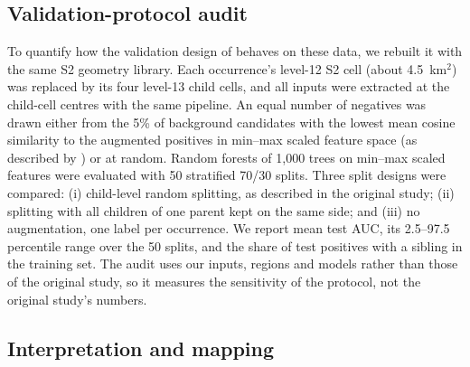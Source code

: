 \documentclass[pdflatex,sn-apa]{sn-jnl}
\begin{document}
\subsection{Validation-protocol audit}\label{sec:audit-methods}

To quantify how the validation design of \citet{Parsa2024} behaves on these data, we rebuilt it with the same S2 geometry library. Each occurrence's level-12 S2 cell (about 4.5~km$^2$) was replaced by its four level-13 child cells, and all inputs were extracted at the child-cell centres with the same pipeline. An equal number of negatives was drawn either from the 5\% of background candidates with the lowest mean cosine similarity to the augmented positives in min--max scaled feature space (as described by \citealp{Parsa2024}) or at random. Random forests of 1,000 trees on min--max scaled features were evaluated with 50 stratified 70/30 splits. Three split designs were compared: (i) child-level random splitting, as described in the original study; (ii) splitting with all children of one parent kept on the same side; and (iii) no augmentation, one label per occurrence. We report mean test AUC, its 2.5--97.5 percentile range over the 50 splits, and the share of test positives with a sibling in the training set. The audit uses our inputs, regions and models rather than those of the original study, so it measures the sensitivity of the protocol, not the original study's numbers.

\subsection{Interpretation and mapping}\label{sec:shap}
\end{document}
